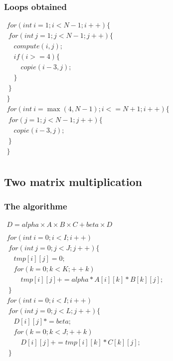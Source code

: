 \documentclass{beamer}
\begin{document}

\begin{frame}
\frametitle{Loops obtained}

{$\begin{array}{l}
for(int~i=1; i<N-1; i++)\{ \\
~for(int~j=1; j<N-1; j++)\{ \\
\quad{}compute(i,j); \\
\quad{}if(i>=4)\{ \\
\qquad{}copie(i-3,j); \\
\quad{}\} \\
~\} \\
\} \\
for(int~i=\max(4, N-1); i<=N+1; i++)\{ \\
~for(j=1; j<N-1; j++)\{ \\
\quad{}copie(i-3,j); \\
~\} \\
\} \\
\end{array}$
}

\end{frame}


\subsection{Two matrix multiplication}

\begin{frame}
\frametitle{The algorithme}

{$\begin{array}{l}
D= alpha\times{}A\times{}B\times{}C + beta\times{}D \\ \\
for (int~i = 0; i < I; i++) \\
~for (int~j = 0; j < J; j++)\{ \\
\quad{}tmp[i][j] = 0; \\
\quad{}for (k = 0; k < K; ++k) \\
\qquad{}tmp[i][j] += alpha * A[i][k] * B[k][j]; \\
~\} \\
for (int~i = 0; i < I; i++) \\
~for (int~j = 0; j < L; j++)\{ \\
\quad{}D[i][j] *= beta; \\
\quad{}for (k = 0; k < J; ++k) \\
\qquad{}D[i][j] += tmp[i][k] * C[k][j]; \\
~\}

\end{array}$
}
\end{frame}
\end{document}
